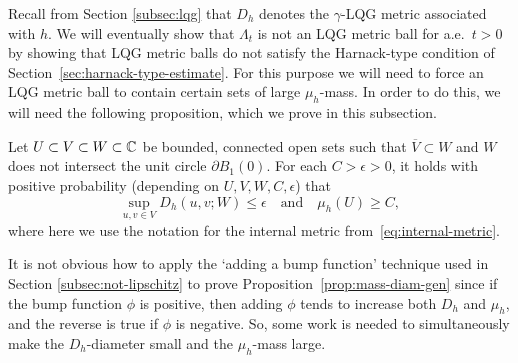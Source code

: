 \documentclass[12pt]{amsart}
\numberwithin{equation}{section}
\newcommand{\regcluster}[2]{\hyperref[eq:regular-cluster]{\Lambda^{#1}_{#2}}}
\begin{document}
	Recall from Section \ref{subsec:lqg} that $D_h$ denotes the $\gamma$-LQG metric associated with $h$. 
	We will eventually show that ${\regcluster{}{t}}$ is not an LQG metric ball for a.e.\ $t>0$ by showing that LQG metric balls do not satisfy the Harnack-type condition of Section~\ref{sec:harnack-type-estimate}. For this purpose we will need to force an LQG metric ball to contain certain sets of large $\mu_h$-mass. In order to do this, we will need the following proposition, which we prove in this subsection. 
	
	\begin{prop} \label{prop:mass-diam-gen}
		Let $U \subset V \subset W\subset  \mathbb{C}$ be bounded, connected open sets such that $\overline V\subset W$ and $W$ does not intersect the unit circle $\partial  B_1(0)$.
		For each $C>\epsilon > 0$, it holds with positive probability (depending on $U,V,W,C,\epsilon$) that
		\begin{equation} \label{eq:mass-diam-gen}
		\sup_{u,v\in V} D_h\left( u , v ; W \right) \leq \epsilon \quad \text{and} \quad \mu_h(U) \geq C ,
		\end{equation}
		where here we use the notation for the internal metric from~\eqref{eq:internal-metric}.
	\end{prop}
	It is not obvious how to apply the `adding a bump function' technique used in Section \ref{subsec:not-lipschitz} to prove Proposition~\ref{prop:mass-diam-gen} since if the bump function $\phi$ is positive, then adding $\phi$ tends to increase both $D_h$ and $\mu_h$, and the reverse is true if $\phi$ is negative. So, some work is needed to simultaneously make the $D_h$-diameter small and the $\mu_h$-mass large. 
	
\end{document}
